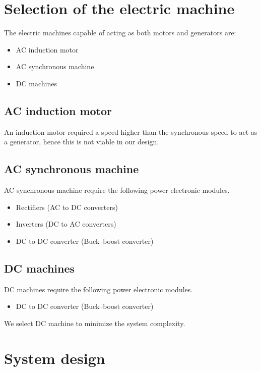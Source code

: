 \documentclass[journal]{IEEEtran}
\begin{document}
\section{Selection of the electric machine}
The electric machines capable of acting as both motors and generators are:
\begin{itemize}
  \item AC induction motor
  \item AC synchronous machine
  \item DC machines
\end{itemize}
\subsection{AC induction motor}
An induction motor required a speed higher than the synchronous speed to act as a generator, hence this is not viable in our design.
\subsection{AC synchronous machine}
AC synchronous machine require the following power electronic modules.
\begin{itemize}
  \item Rectifiers (AC to DC converters)
  \item Inverters (DC to AC converters)
  \item DC to DC converter (Buck–boost converter)
\end{itemize}
\subsection{DC machines}
DC machines require the following power electronic modules.
\begin{itemize}
  \item DC to DC converter (Buck–boost converter)
\end{itemize}

We select DC machine to minimize the system complexity.

\section{System design}
\end{document}
